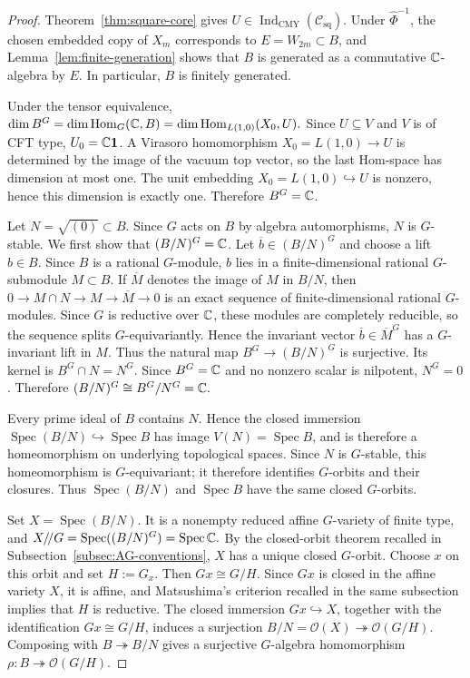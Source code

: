 \documentclass[10pt,a4paper]{amsart}
\numberwithin{equation}{section} \newtheorem{thm}{Theorem}[section] \newtheorem{lem}[thm]{Lemma} \newtheorem{ex}[thm]{Example} \newtheorem{prop}[thm]{Proposition} \newtheorem{cor}[thm]{Corollary} \newtheorem{defi}[thm]{Definition} \newtheorem{rmk}[thm]{Remark} \newtheorem{notation}[thm]{Notation}
\newcommand{\one}{\mathbf{1}}
\newcommand{\Spec}{\operatorname{Spec}}
\newcommand{\Hom}{\operatorname{Hom}}
\newcommand{\OO}{\mathcal O}
\newcommand{\Csq}{\mathcal C_{\mathrm{sq}}}
\newcommand{\IndCMY}{\operatorname{Ind}_{\mathrm{CMY}}}
\begin{document}
\begin{proof}
Theorem~\ref{thm:square-core} gives $U\in\IndCMY(\Csq)$. Under \(\widehat\Phi^{-1}\), the chosen embedded copy of $X_m$ corresponds to $E=W_{2m}\subset B$, and Lemma~\ref{lem:finite-generation} shows that $B$ is generated as a commutative $\mathbb{C}$-algebra by $E$. In particular, $B$ is finitely generated.

Under the tensor equivalence, \(\dim B^G=\dim\Hom_G(\C,B)=\dim\Hom_{L(1,0)}(X_0,U).\) Since $U\subseteq V$ and $V$ is of CFT type, $U_0=\C\one$. A Virasoro homomorphism $X_0=L(1,0)\to U$ is determined by the image of the vacuum top vector, so the last Hom-space has dimension at most one. The unit embedding $X_0=L(1,0)\hookrightarrow U$ is nonzero, hence this dimension is exactly one. Therefore \(B^G=\mathbb{C}\).

Let \(N=\sqrt{(0)}\subset B\). Since \(G\) acts on \(B\) by algebra automorphisms, \(N\) is \(G\)-stable. We first show that \((B/N)^G=\mathbb{C}\). Let \(\overline b\in(B/N)^G\) and choose a lift \(b\in B\). Since \(B\) is a rational \(G\)-module, \(b\) lies in a finite-dimensional rational \(G\)-submodule \(M\subset B\). If \(\overline M\) denotes the image of \(M\) in \(B/N\), then \(0\longrightarrow M\cap N\longrightarrow M\longrightarrow\overline M\longrightarrow0\) is an exact sequence of finite-dimensional rational \(G\)-modules. Since \(G\) is reductive over \(\mathbb{C}\), these modules are completely reducible, so the sequence splits \(G\)-equivariantly. Hence the invariant vector \(\overline b\in\overline M^G\) has a \(G\)-invariant lift in \(M\). Thus the natural map \(B^G\to(B/N)^G\) is surjective. Its kernel is \(B^G\cap N=N^G\). Since \(B^G=\mathbb{C}\) and no nonzero scalar is nilpotent, \(N^G=0\). Therefore $ (B/N)^G\cong B^G/N^G=\mathbb{C}. $

Every prime ideal of $B$ contains $N$. Hence the closed immersion $\Spec(B/N)\hookrightarrow\Spec B$ has image $V(N)=\Spec B$, and is therefore a homeomorphism on underlying topological spaces. Since $N$ is $G$-stable, this homeomorphism is $G$-equivariant; it therefore identifies $G$-orbits and their closures. Thus $\Spec(B/N)$ and $\Spec B$ have the same closed $G$-orbits.

Set $X=\Spec(B/N)$. It is a nonempty reduced affine $G$-variety of finite type, and \(X/\!/G=\Spec((B/N)^G)=\Spec\C.\) By the closed-orbit theorem recalled in Subsection~\ref{subsec:AG-conventions}, $X$ has a unique closed $G$-orbit. Choose $x$ on this orbit and set $H:=G_x$. Then $Gx\cong G/H$. Since $Gx$ is closed in the affine variety $X$, it is affine, and Matsushima's criterion recalled in the same subsection implies that $H$ is reductive. The closed immersion $Gx\hookrightarrow X$, together with the identification $Gx\cong G/H$, induces a surjection \(B/N=\OO(X)\twoheadrightarrow\OO(G/H).\) Composing with $B\twoheadrightarrow B/N$ gives a surjective $G$-algebra homomorphism \(\rho:B\twoheadrightarrow\OO(G/H).\)


\end{proof}
\end{document}
